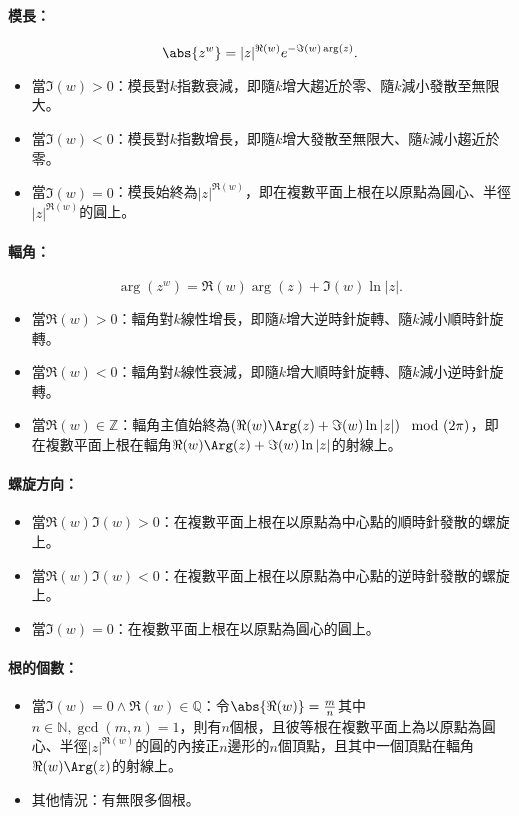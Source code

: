 \documentclass[a4paper,12pt]{article}
\begin{document}
\paragraph*{模長：}
\[\abs{z^w}=|z|^{\Re(w)}e^{-\Im(w)\arg(z)}.\]
\begin{itemize}
\item 當$\Im(w)>0$：模長對$k$指數衰減，即隨$k$增大趨近於零、隨$k$減小發散至無限大。
\item 當$\Im(w)<0$：模長對$k$指數增長，即隨$k$增大發散至無限大、隨$k$減小趨近於零。
\item 當$\Im(w)=0$：模長始終為$|z|^{\Re(w)}$，即在複數平面上根在以原點為圓心、半徑$|z|^{\Re(w)}$的圓上。
\end{itemize}
\paragraph*{輻角：}
\[\arg\left(z^w\right)=\Re(w)\arg(z)+\Im(w)\ln|z|.\]
\begin{itemize}
\item 當$\Re(w)>0$：輻角對$k$線性增長，即隨$k$增大逆時針旋轉、隨$k$減小順時針旋轉。
\item 當$\Re(w)<0$：輻角對$k$線性衰減，即隨$k$增大順時針旋轉、隨$k$減小逆時針旋轉。
\item 當$\Re(w)\in\mathbb{Z}$：輻角主值始終為$\left(\Re(w)\Arg(z)+\Im(w)\ln|z|\right)\mod (2\pi)$，即在複數平面上根在輻角$\Re(w)\Arg(z)+\Im(w)\ln|z|$的射線上。
\end{itemize}
\paragraph*{螺旋方向：}
\begin{itemize}
\item 當$\Re(w)\Im(w)>0$：在複數平面上根在以原點為中心點的順時針發散的螺旋上。
\item 當$\Re(w)\Im(w)<0$：在複數平面上根在以原點為中心點的逆時針發散的螺旋上。
\item 當$\Im(w)=0$：在複數平面上根在以原點為圓心的圓上。
\end{itemize}
\paragraph*{根的個數：}
\begin{itemize}
\item 當$\Im(w)=0\land\Re(w)\in\mathbb{Q}$：令$\abs{\Re(w)}=\frac{m}{n}$其中$n\in\mathbb{N},\gcd(m,n)=1$，則有$n$個根，且彼等根在複數平面上為以原點為圓心、半徑$|z|^{\Re(w)}$的圓的內接正$n$邊形的$n$個頂點，且其中一個頂點在輻角$\Re(w)\Arg(z)$的射線上。
\item 其他情況：有無限多個根。
\end{itemize}
\end{document}
